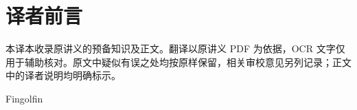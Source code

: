 \documentclass[BookTitleCN={代数几何（二）},OriginalAuthor={Jean-François Dat},OriginalYear={2009-2010},Translator={Fingolfin},TranslationDate={2026年10月25日},ModelUsed={Codex},BibStyle=numeric]{mathtranslation}
\begin{document}
\hypersetup{pageanchor=false}
\makecover
\cleardoublepage
\hypersetup{pageanchor=true}
\frontmatter
\chapter*{译者前言}
本译本收录原讲义的预备知识及正文。翻译以原讲义 PDF 为依据，OCR 文字仅用于辅助核对。原文中疑似有误之处均按原样保留，相关审校意见另列记录；正文中的译者说明均明确标示。
\par\medskip\hfill Fingolfin
\makecontents

\mainmatter









\backmatter
\printterminology
\end{document}
